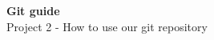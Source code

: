 \documentclass[a4paper,12pt]{article}
\newcommand{\<}{\textless}
\renewcommand{\>}{\textgreater}
\begin{document}
\begin{center}
 \huge{\textbf{Git guide}}\\[.5em]
 \Large{Project 2 - How to use our git repository}
\end{center}
\vspace{3em}
\tableofcontents

\newpage
\end{document}
